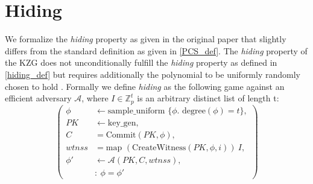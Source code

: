 \section{Hiding}
We formalize the \textit{hiding} property as given in the original paper \parencite{KZG} that slightly differs from the standard definition as given in \ref{PCS_def}. 
The \textit{hiding} property of the KZG does not unconditionally fulfill the \textit{hiding} property as defined in \ref{hiding_def} but requires additionally the polynomial to be uniformly randomly chosen to hold \parencite{KZG}. Formally we define \textit{hiding} as the following game against an efficient adversary $\mathcal{A}$, where $I\in\mathbb{Z}_p^t$ is an arbitrary distinct list of length t:
\begin{equation*}
    \left(
        \begin{aligned}
            \phi & \leftarrow \text{sample\_uniform } \{\phi. \text{ degree}(\phi)=t\},\\
            PK & \leftarrow \text{key\_gen}, \\
            C & = \text{Commit}(PK,\phi), \\
            wtnss &= \text{map } (\text{CreateWitness}(PK,\phi,i))\ I,\\
            \phi' & \leftarrow \mathcal{A}(PK,C,wtnss), \\
            & : \ \phi = \phi'
        \end{aligned}
    \right)
\end{equation*}

